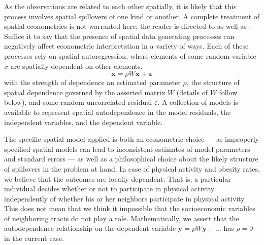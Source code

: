 \documentclass[Crown,sageh.bst]{sagej}
\begin{document}
As the observations are related to each other spatially, it is likely
that this process involves spatial spillovers of one kind or another. A
complete treatment of spatial econometrics is not warranted here; the
reader is directed to \citet{LeSage2009} as well as \citet{LeSage2014}.
Suffice it to say that the presence of spatial data generating processes
can negatively affect econometric interpretation in a variety of ways.
Each of these processes rely on spatial autoregression, where elements
of some random variable \(x\) are spatially dependent on other elements,
\begin{equation}\label{eq:autoregression}
 \boldsymbol{x} = \rho W \boldsymbol{x} + \boldsymbol{\varepsilon}
\end{equation} with the strength of dependence an estimated parameter
\(\rho\), the structure of spatial dependence governed by the asserted
matrix \(W\) (details of \(W\) follow below), and some random
uncorrelated residual \(\varepsilon\). A collection of models is
available to represent spatial autodependence in the model residuals,
the independent variables, and the dependent variable.

The specific spatial model applied is both an econometric choice --- as
improperly specified spatial models can lead to inconsistent estimates
of model parameters and standard errors --- as well as a philosophical
choice about the likely structure of spillovers in the problem at hand.
In case of physical activity and obesity rates, we believe that the
outcomes are locally dependent: That is, a particular individual decides
whether or not to participate in physical activity independently of
whether his or her neighbors participate in physical activity. This does
not mean that we think it impossible that the socioeconomic variables of
neighboring tracts do not play a role. Mathematically, we assert that
the autodependence relationship on the dependent variable
\(\boldsymbol{y} = \rho W \boldsymbol{y} + \ldots\) has \(\rho = 0\) in
the current case.
\end{document}
